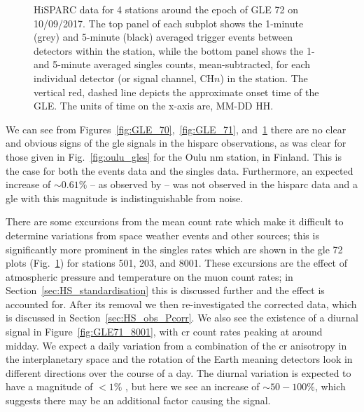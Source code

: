 \begin{figure}[ht!]
	\caption{HiSPARC data for 4 stations around the epoch of GLE 72 on 10/09/2017. The top panel of each subplot shows the 1-minute (grey) and 5-minute (black) averaged trigger events between detectors within the station, while the bottom panel shows the 1- and 5-minute averaged singles counts, mean-subtracted, for each individual detector (or signal channel, CH$n$) in the station. The vertical red, dashed line depicts the approximate onset time of the GLE. The units of time on the x-axis are, MM-DD HH.}
	\label{fig:GLE_72}
\end{figure}


We can see from Figures~\ref{fig:GLE_70},~\ref{fig:GLE_71}, and~\ref{fig:GLE_72} there are no clear and obvious signs of the \gls{gle} signals in the \gls{hisparc} observations, as was clear for those given in Fig.~\ref{fig:oulu_gles} for the Oulu \gls{nm} station, in Finland. This is the case for both the events data and the singles data. Furthermore, an expected increase of $\sim0.61\%$ -- as observed by \citet{timashkov_ground_2008} -- was not observed in the \gls{hisparc} data and a \gls{gle} with this magnitude is indistinguishable from noise.

There are some excursions from the mean count rate which make it difficult to determine variations from space weather events and other sources; this is significantly more prominent in the singles rates which are shown in the \gls{gle} 72 plots (Fig.~\ref{fig:GLE_72}) for stations 501, 203, and 8001. These excursions are the effect of atmospheric pressure and temperature on the muon count rates; in Section~\ref{sec:HS_standardisation} this is discussed further and the effect is accounted for. After its removal we then re-investigated the corrected data, which is discussed in Section~\ref{sec:HS_obs_Pcorr}. We also see the existence of a diurnal signal in Figure~\ref{fig:GLE71_8001}, with \gls{cr} count rates peaking at around midday. We expect a daily variation from a combination of the \gls{cr} anisotropy in the interplanetary space and the rotation of the Earth meaning detectors look in different directions over the course of a day. The diurnal variation is expected to have a magnitude of $<1\%$ \citep{mishra_study_2007, mishra_cosmic_2008, dubey_cosmic_2016, thomas_decadal_2017}, but here we see an increase of $\sim50-100\%$, which suggests there may be an additional factor causing the signal.


